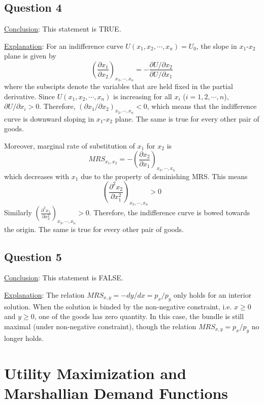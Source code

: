 \documentclass{article}
\begin{document}
\subsection{Question 4}
\noindent\underline{Conclusion}: This statement is TRUE.

\noindent\underline{Explanation}: For an indifference curve $U(x_1,x_2,\cdots,x_n)=U_0$, the slope in $x_1$-$x_2$ plane is given by
\begin{equation*}
	\left(\frac{\partial x_1}{\partial x_2}\right)_{x_3,\cdots,x_n}=-\frac{\partial U/\partial x_2}{\partial U/\partial x_1}
\end{equation*}
where the subscipts denote the variables that are held fixed in the partial derivative. Since $U(x_1,x_2,\cdots,x_n)$ is increasing for all $x_i$ ($i=1,2,\cdots,n$), $\partial U/\partial x_i>0$. Therefore, $(\partial x_1/\partial x_2)_{x_3,\cdots,x_n}<0$, which means that the indifference curve is downward sloping in $x_1$-$x_2$ plane. The same is true for every other pair of goods.

Moreover, marginal rate of substitution of $x_1$ for $x_2$ is
\begin{equation*}
	MRS_{x_1,x_2}=-\left(\frac{\partial x_2}{\partial x_1}\right)_{x_3,\cdots,x_n}
\end{equation*}
which decreases with $x_1$ due to the property of deminishing MRS. This means
\begin{equation*}
	\left(\frac{\partial^2x_2}{\partial x_1^2}\right)_{x_3,\cdots,x_n}>0
\end{equation*}
Similarly $\left(\frac{\partial^2x_1}{\partial x_2^2}\right)_{x_3,\cdots,x_n}>0$. Therefore, the indifference curve is bowed towards the origin. The same is true for every other pair of goods.

\subsection{Question 5}
\noindent\underline{Conclusion}: This statement is FALSE.

\noindent\underline{Explanation}: The relation $MRS_{x,y}=-dy/dx=p_x/p_y$ only holds for an interior solution. When the solution is binded by the non-negative constraint, i.e. $x\geqslant0$ and $y\geqslant0$, one of the goods has zero quantity. In this case, the bundle is still maximal (under non-negative constraint), though the relation $MRS_{x,y}=p_x/p_y$ no longer holds.

\section{Utility Maximization and Marshallian Demand Functions}
\end{document}
